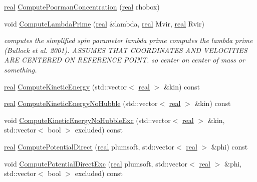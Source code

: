\begin{DoxyCompactItemize}
\item 
\hyperlink{Global_8h_a031f8951175b43076c2084a6c2173410}{real} \hyperlink{classHaloProperties_ac72e7d61cf10ee11b8f72af2bf32905a}{ComputePoormanConcentration} (\hyperlink{Global_8h_a031f8951175b43076c2084a6c2173410}{real} rhobox)
\item 
void \hyperlink{classHaloProperties_a675fb78ade0e9497338464fc275c2fd5}{ComputeLambdaPrime} (\hyperlink{Global_8h_a031f8951175b43076c2084a6c2173410}{real} \&lambda, \hyperlink{Global_8h_a031f8951175b43076c2084a6c2173410}{real} Mvir, \hyperlink{Global_8h_a031f8951175b43076c2084a6c2173410}{real} Rvir)
\begin{DoxyCompactList}\small\item\em computes the simplified spin parameter lambda prime computes the lambda prime (Bullock et al. 2001). ASSUMES THAT COORDINATES AND VELOCITIES ARE CENTERED ON REFERENCE POINT. so center on center of mass or something. \item\end{DoxyCompactList}\item 
\hyperlink{Global_8h_a031f8951175b43076c2084a6c2173410}{real} \hyperlink{classHaloProperties_adb78899cbb93730081f5473c5c82608f}{ComputeKineticEnergy} (std::vector$<$ \hyperlink{Global_8h_a031f8951175b43076c2084a6c2173410}{real} $>$ \&kin) const 
\item 
\hyperlink{Global_8h_a031f8951175b43076c2084a6c2173410}{real} \hyperlink{classHaloProperties_ad5bee5f08cc37cc127185acd1ac8bdf3}{ComputeKineticEnergyNoHubble} (std::vector$<$ \hyperlink{Global_8h_a031f8951175b43076c2084a6c2173410}{real} $>$ \&kin) const 
\item 
void \hyperlink{classHaloProperties_a0d140ad1df53e8ebfaf0bb51c9e54029}{ComputeKineticEnergyNoHubbleExc} (std::vector$<$ \hyperlink{Global_8h_a031f8951175b43076c2084a6c2173410}{real} $>$ \&kin, std::vector$<$ bool $>$ excluded) const 
\item 
\hyperlink{Global_8h_a031f8951175b43076c2084a6c2173410}{real} \hyperlink{classHaloProperties_a78889a58d246ccfa468569ed6eafdc68}{ComputePotentialDirect} (\hyperlink{Global_8h_a031f8951175b43076c2084a6c2173410}{real} plumsoft, std::vector$<$ \hyperlink{Global_8h_a031f8951175b43076c2084a6c2173410}{real} $>$ \&phi) const 
\item 
void \hyperlink{classHaloProperties_a67050766e04467c84de53e83fefc139d}{ComputePotentialDirectExc} (\hyperlink{Global_8h_a031f8951175b43076c2084a6c2173410}{real} plumsoft, std::vector$<$ \hyperlink{Global_8h_a031f8951175b43076c2084a6c2173410}{real} $>$ \&phi, std::vector$<$ bool $>$ excluded) const 

\end{DoxyCompactItemize}
